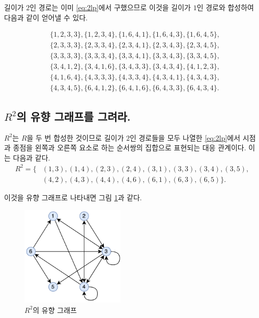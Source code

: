\documentclass{oblivoir}
\renewcommand{\figurename}{그림}
\newcommand{\figref}[1]{\figurename{} \ref{#1}}
\begin{document}
길이가 $2$인 경로는 이미 \eqref{eq:2lp}에서 구했으므로
이것을 길이가 $1$인 경로와 합성하여 다음과 같이 얻어낼 수 있다.

\begin{equation}\label{eq:2lp}
    \begin{aligned}
        &\{1,2,3,3\}, \{1,2,3,4\}, \{1,6,4,1\}, \{1,6,4,3\}, \{1,6,4,5\}, \\
        &\{2,3,3,3\}, \{2,3,3,4\}, \{2,3,4,1\}, \{2,3,4,3\}, \{2,3,4,5\}, \\
        &\{3,3,3,3\}, \{3,3,3,4\}, \{3,3,4,1\}, \{3,3,4,3\}, \{3,3,4,5\}, \\
        &\{3,4,1,2\}, \{3,4,1,6\}, \{3,4,3,3\}, \{3,4,3,4\}, \{4,1,2,3\}, \\
        &\{4,1,6,4\}, \{4,3,3,3\}, \{4,3,3,4\}, \{4,3,4,1\}, \{4,3,4,3\}, \\
        &\{4,3,4,5\}, \{6,4,1,2\}, \{6,4,1,6\}, \{6,4,3,3\}, \{6,4,3,4\}.
    \end{aligned}
\end{equation}

\subsection{$R^2$의 유향 그래프를 그려라.}

$R^2$는 $R$을 두 번 합성한 것이므로
길이가 $2$인 경로들을 모두 나열한 \eqref{eq:2lp}에서
시점과 종점을 왼쪽과 오른쪽 요소로 하는 순서쌍의 집합으로 표현되는
대응 관계이다.
이는 다음과 같다.
\begin{equation}
    \begin{aligned}
        R^2 = \{
            &(1,3), (1,4), (2,3), (2,4), (3,1), (3,3), (3,4), (3,5), \\
            &(4,2), (4,3), (4,4), (4,6), (6,1), (6,3), (6,5)
        \}.
    \end{aligned}
\end{equation}

이것을 유향 그래프로 나타내면 \figref{fig:17-8}과 같다.

\begin{figure}[h]
    \centering
    \includegraphics[width=5cm]{17-8}
    \caption{$R^2$의 유향 그래프}
    \label{fig:17-8}
\end{figure}
\end{document}
